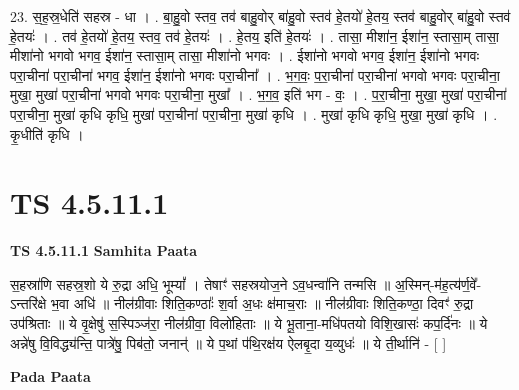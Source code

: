 \documentclass[17pt]{extarticle}
\begin{document}
23. स॒ह॒स्र॒धेति॑ सहस्र - धा । . बा॒हु॒वो स्तव॒ तव॑ बाहु॒वोर् बा॑हु॒वो स्तव॑ हे॒तयो॑ हे॒तय॒ स्तव॑ बाहु॒वोर् बा॑हु॒वो स्तव॑ हे॒तयः॑ । . तव॑ हे॒तयो॑ हे॒तय॒ स्तव॒ तव॑ हे॒तयः॑ । . हे॒तय॒ इति॑ हे॒तयः॑ । . तासा॒ मीशा॑न॒ ईशा॑न॒ स्तासा॒म् तासा॒ मीशा॑नो भगवो भगव॒ ईशा॑न॒ स्तासा॒म् तासा॒ मीशा॑नो भगवः । . ईशा॑नो भगवो भगव॒ ईशा॑न॒ ईशा॑नो भगवः परा॒चीना॑ परा॒चीना॑ भगव॒ ईशा॑न॒ ईशा॑नो भगवः परा॒चीना᳚ । . भ॒ग॒वः॒ प॒रा॒चीना॑ परा॒चीना॑ भगवो भगवः परा॒चीना॒ मुखा॒ मुखा॑ परा॒चीना॑ भगवो भगवः परा॒चीना॒ मुखा᳚ । . भ॒ग॒व॒ इति॑ भग - वः॒ । . प॒रा॒चीना॒ मुखा॒ मुखा॑ परा॒चीना॑ परा॒चीना॒ मुखा॑ कृधि कृधि॒ मुखा॑ परा॒चीना॑ परा॒चीना॒ मुखा॑ कृधि । . मुखा॑ कृधि कृधि॒ मुखा॒ मुखा॑ कृधि । . कृ॒धीति॑ कृधि । \newline
\pagebreak
{}

\section{ TS 4.5.11.1 }

\textbf{TS 4.5.11.1 } \newline
\textbf{Samhita Paata} \newline

स॒हस्रा॑णि सहस्र॒शो ये रु॒द्रा अधि॒ भूम्यां᳚ । तेषाꣳ॑ सहस्रयोज॒ने ऽव॒धन्वा॑नि तन्मसि ॥                                      अ॒स्मिन्-म॑ह॒त्य॑र्ण॒वे᳚-ऽन्तरि॑क्षे भ॒वा अधि॑ ॥                                     नील॑ग्रीवाः शिति॒कण्ठाः᳚ श॒र्वा अ॒धः क्ष॑माच॒राः ॥                                नील॑ग्रीवाः शिति॒कण्ठा॒ दिवꣳ॑ रु॒द्रा उप॑श्रिताः ॥                         ये वृ॒क्षेषु॑ स॒स्पिञ्ज॑रा॒ नील॑ग्रीवा॒ विलो॑हिताः ॥                                        ये भू॒ताना॒-मधि॑पतयो विशि॒खासः॑ कप॒र्दि॑नः ॥                                    ये अन्ने॑षु वि॒विद्ध्य॑न्ति॒ पात्रे॑षु॒ पिब॑तो॒ जनान्॑ ॥                                       ये प॒थां प॑थि॒रक्ष॑य ऐलबृ॒दा य॒व्युधः॑ ॥ ये ती॒र्थानि॑ - [  ] \newline

\textbf{Pada Paata} \newline
\end{document}
